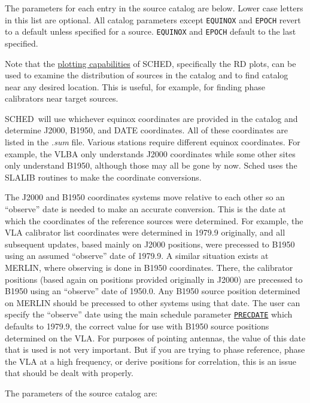 \documentclass{report}
\newcommand{\sched}{{\sc SCHED}}
\newcommand{\schedb}{{\sc SCHED~}}
\begin{document}
The parameters for each entry in the source catalog are below.  Lower
case letters in this list are optional.  All catalog parameters except
{\tt EQUINOX} and {\tt EPOCH} revert to a default unless specified
for a source. {\tt EQUINOX} and {\tt EPOCH} default to the last specified.

Note that the 
{\hyperref[SEC:PLOT]{plotting capabilities}} of \sched,
specifically the RD plots, can be used to examine the distribution
of sources in the catalog and to find catalog near any desired
location.  This is useful, for example, for finding phase calibrators
near target sources.

\schedb will use whichever equinox coordinates are provided in the
catalog and determine J2000, B1950, and DATE coordinates.  All of
these coordinates are listed in the {\sl .sum} file.  Various stations
require different equinox coordinates.  For example, the VLBA only
understands J2000 coordinates while some other sites only understand
B1950, although those may all be gone by now.  Sched uses the SLALIB
routines to make the coordinate conversions.

The J2000 and B1950 coordinates systems move relative to each other so
an ``observe'' date is needed to make an accurate conversion.  This is
the date at which the coordinates of the reference sources were
determined.  For example, the VLA calibrator list coordinates were
determined in 1979.9 originally, and all subsequent updates, based
mainly on J2000 positions, were precessed to B1950 using an assumed
``observe'' date of 1979.9.  A similar situation exists at MERLIN,
where observing is done in B1950 coordinates.  There, the calibrator
positions (based again on positions provided originally in J2000) are
precessed to B1950 using an ``observe'' date of 1950.0.  Any B1950
source position determined on MERLIN should be precessed to other
systems using that date.  The user can specify the ``observe'' date
using the main schedule parameter 
{\hyperref[MP:PRECDATE]{{\tt PRECDATE}}}
which defaults to 1979.9, the correct value for use with
B1950 source positions determined on the VLA.  For purposes of
pointing antennas, the value of this date that is used is not very
important.  But if you are trying to phase reference, phase the VLA at
a high frequency, or derive positions for correlation, this is an
issue that should be dealt with properly.

The parameters of the source catalog are:
\end{document}

